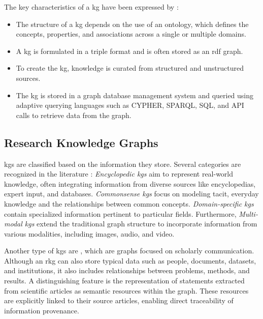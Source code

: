 The key characteristics of a \gls{kg} have been expressed by \autocite{verma_scholarly_2023}: 
\begin{itemize}
    \item The structure of a \gls{kg} depends on the use of an ontology, which defines the concepts, properties, and associations across a single or multiple domains.
    \item A \gls{kg} is formulated in a triple format and is often stored as an \gls{rdf} graph.
    \item To create the \gls{kg}, knowledge is curated from structured and unstructured sources.
    \item The \gls{kg} is stored in a graph database management system and queried using adaptive querying languages such as CYPHER, SPARQL, SQL, and API calls to retrieve data from the graph.
\end{itemize}

\subsection{Research Knowledge Graphs}

\glspl{kg} are classified based on the information they store. Several categories are recognized in the literature \cite{pan_unifying_2024}: \emph{Encyclopedic \glspl{kg}} aim to represent real-world knowledge, often integrating information from diverse sources like encyclopedias, expert input, and databases. \emph{Commonsense \glspl{kg}} focus on modeling tacit, everyday knowledge and the relationships between common concepts. \emph{Domain-specific \glspl{kg}} contain specialized information pertinent to particular fields. Furthermore, \emph{Multi-modal \glspl{kg}} extend the traditional graph structure to incorporate information from various modalities, including images, audio, and video.

Another type of \glspl{kg} are , which are graphs focused on scholarly communication. Although an \gls{rkg} can also store typical data such as people, documents, datasets, and institutions, it also includes relationships between problems, methods, and results. A distinguishing feature is the representation of statements extracted from scientific articles as semantic resources within the graph. These resources are explicitly linked to their source articles, enabling direct traceability of information provenance. \cite{auer_towards_2018}

